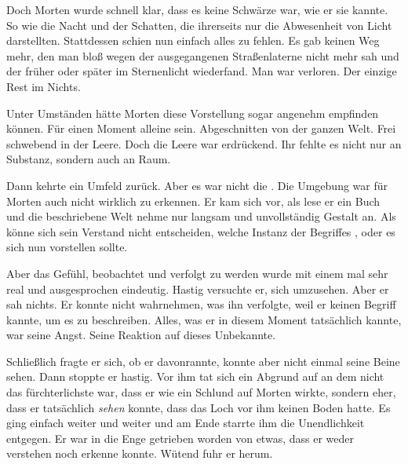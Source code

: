\par

Doch Morten wurde schnell klar, dass es keine Schwärze war, wie er sie kannte. So wie die Nacht und der Schatten, die ihrerseits nur die Abwesenheit von Licht darstellten. Stattdessen schien nun einfach alles zu fehlen. Es gab keinen Weg mehr, den man bloß wegen der ausgegangenen Straßenlaterne nicht mehr sah und der früher oder später im Sternenlicht wiederfand. Man war verloren. Der einzige Rest im Nichts.

\par

Unter Umständen hätte Morten diese Vorstellung sogar angenehm empfinden können. Für einen Moment alleine sein. Abgeschnitten von der ganzen Welt. Frei schwebend in der Leere. Doch die Leere war erdrückend. Ihr fehlte es nicht nur an Substanz, sondern auch an Raum.

\par

Dann kehrte ein Umfeld zurück. Aber es war nicht die . Die Umgebung war für Morten auch nicht wirklich zu erkennen. Er kam sich vor, als lese er ein Buch und die beschriebene Welt nehme nur langsam und unvollständig Gestalt an. Als könne sich sein Verstand nicht entscheiden, welche Instanz der Begriffes ,  oder  es sich nun vorstellen sollte.

\par

Aber das Gefühl, beobachtet und verfolgt zu werden wurde mit einem mal sehr real und ausgesprochen eindeutig. Hastig versuchte er, sich umzusehen. Aber er sah nichts. Er konnte nicht wahrnehmen, was ihn verfolgte, weil er keinen Begriff kannte, um es zu beschreiben. Alles, was er in diesem Moment tatsächlich kannte, war seine Angst. Seine Reaktion auf dieses Unbekannte.

\par

Schließlich fragte er sich, ob er davonrannte, konnte aber nicht einmal seine Beine sehen. Dann stoppte er hastig. Vor ihm tat sich ein Abgrund auf an dem nicht das fürchterlichste war, dass er wie ein Schlund auf Morten wirkte, sondern eher, dass er tatsächlich \textit{sehen} konnte, dass das Loch vor ihm keinen Boden hatte. Es ging einfach weiter und weiter und am Ende starrte ihm die Unendlichkeit entgegen. Er war in die Enge getrieben worden von etwas, dass er weder verstehen noch erkenne konnte. Wütend fuhr er herum.

